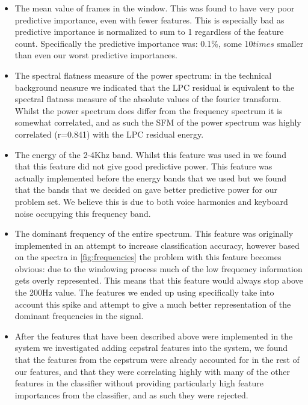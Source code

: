 \documentclass[ %
                    author={Sam Phippen},
                supervisor={Dr. Rafal Bogacz},
                     title={Real time voice activity detectors in noisy personal computing environments},
                  subtitle={},
                    degree={MEng},
                      year={2012} ]{thesis}
\begin{document}
\begin{itemize}

    \item The mean value of frames in the window. This was found to have very
        poor predictive importance, even with fewer features.  This is
        especially bad as predictive importance is normalized to sum to 1
        regardless of the feature count.  Specifically the predictive
        importance was: 0.1\%, some 10$times$ smaller than even our worst
        predictive importances.

    \item The spectral flatness measure of the power spectrum: in the technical
        background neasure we indicated that the LPC residual is equivalent to
        the spectral flatness measure of the absolute values of the fourier
        transform. Whilst the power spectrum does differ from the frequency
        spectrum it is somewhat correlated, and as such the SFM of the power
        spectrum was highly correlated (r=0.841) with the LPC residual energy.

    \item The energy of the 2-4Khz band. Whilst this feature was used in
        \cite{shin} we found that this feature did not give good predictive
        power.  This feature was actually implemented before the energy bands
        that we used but we found that the bands that we decided on gave better
        predictive power for our problem set. We believe this is due to both voice
        harmonics and keyboard noise occupying this frequency band.

    \item The dominant frequency of the entire spectrum. This feature was
        originally implemented in an attempt to increase classification
        accuracy, however based on the spectra in \ref{fig:frequencies} the
        problem with this feature becomes obvious: due to the windowing process
        much of the low frequency information gets overly represented. This
        means that this feature would always stop above the 200Hz value. The
        features we ended up using specifically take into account this spike
        and attempt to give a much better representation of the dominant
        frequencies in the signal.

    \item After the features that have been described above were implemented in
        the system we investigated adding cepstral features into the system, we
        found that the features from the cepstrum were already accounted for in
        the rest of our features, and that they were correlating highly with
        many of the other features in the classifier without providing
        particularly high feature importances from the classifier, and as such
        they were rejected.

    \end{itemize}
\end{document}
